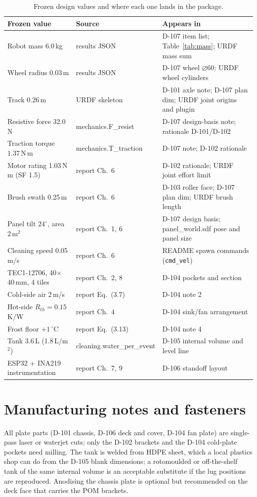 \documentclass[11pt,a4paper]{article}
\newcommand{\fpath}[1]{{\ttfamily\small #1}}
\begin{document}
\begin{table}[h]
\centering
\caption{Frozen design values and where each one lands in the package.}
\label{tab:trace}
\small
\begin{tabular}{p{}p{}p{}}
\toprule
Frozen value & Source & Appears in \\
\midrule
Robot mass 6.0\,kg & results JSON & D-107 item list; Table~\ref{tab:mass};
URDF mass sum \\
Wheel radius 0.03\,m & results JSON & D-107 wheel $\varnothing$60; URDF
wheel cylinders \\
Track 0.26\,m & URDF skeleton & D-101 axle note; D-107 plan dim; URDF
joint origins and plugin \\
Resistive force 32.0\,N & \fpath{mechanics.F\_resist} & D-107 design-basis
note; rationale D-101/D-102 \\
Traction torque 1.37\,N\,m & \fpath{mechanics.T\_traction} & D-107 note;
D-102 rationale \\
Motor rating 1.03\,N\,m (SF 1.5) & report Ch.~6 & D-102 rationale; URDF
joint effort limit \\
Brush swath 0.25\,m & report Ch.~6 & D-103 roller face; D-107 plan dim;
URDF brush length \\
Panel tilt $24^\circ$, area 2\,m$^2$ & report Ch.~1, 6 & D-107 design
basis; \fpath{panel\_world.sdf} pose and panel size \\
Cleaning speed 0.05\,m/s & report Ch.~6 & README spawn commands
(\texttt{cmd\_vel}) \\
TEC1-12706, 40$\times$40\,mm, 4 tiles & report Ch.~2, 8 & D-104 pockets and
section \\
Cold-side air 2\,m/s & report Eq.~(3.7) & D-104 note 2 \\
Hot-side $R_{th}=0.15$\,K/W & report Ch.~4 & D-104 sink/fan arrangement \\
Frost floor $+1\,^\circ$C & report Eq.~(3.13) & D-104 note 4 \\
Tank 3.6\,L (1.8\,L/m$^2$) & \fpath{cleaning.water\_per\_event} & D-105
internal volume and level line \\
ESP32 + INA219 instrumentation & report Ch.~7, 9 & D-106 standoff layout \\
\bottomrule
\end{tabular}
\end{table}

\section{Manufacturing notes and fasteners}
All plate parts (D-101 chassis, D-106 deck and cover, D-104 fan plate) are
single-pass laser or waterjet cuts; only the D-102 brackets and the D-104
cold-plate pockets need milling. The tank is welded from HDPE sheet, which a
local plastics shop can do from the D-105 blank dimensions; a rotomoulded or
off-the-shelf tank of the same internal volume is an acceptable substitute
if the lug positions are reproduced. Anodising the chassis plate is optional
but recommended on the deck face that carries the POM brackets.
\end{document}
